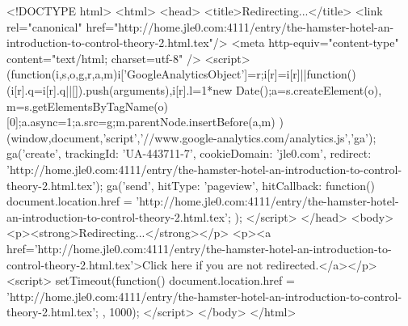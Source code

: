 <!DOCTYPE html>
<html>
<head>
<title>Redirecting...</title>
<link rel="canonical" href="http://home.jle0.com:4111/entry/the-hamster-hotel-an-introduction-to-control-theory-2.html.tex"/>
<meta http-equiv="content-type" content="text/html; charset=utf-8" />
<script>
(function(i,s,o,g,r,a,m){i['GoogleAnalyticsObject']=r;i[r]=i[r]||function(){
(i[r].q=i[r].q||[]).push(arguments)},i[r].l=1*new Date();a=s.createElement(o),
m=s.getElementsByTagName(o)[0];a.async=1;a.src=g;m.parentNode.insertBefore(a,m)
})(window,document,'script','//www.google-analytics.com/analytics.js','ga');
ga('create', { trackingId: 'UA-443711-7', cookieDomain: 'jle0.com', redirect: 'http://home.jle0.com:4111/entry/the-hamster-hotel-an-introduction-to-control-theory-2.html.tex'});
ga('send', { hitType: 'pageview', hitCallback: function() { document.location.href = 'http://home.jle0.com:4111/entry/the-hamster-hotel-an-introduction-to-control-theory-2.html.tex'; } });
</script>
</head>
<body>
  <p><strong>Redirecting...</strong></p>
  <p><a href='http://home.jle0.com:4111/entry/the-hamster-hotel-an-introduction-to-control-theory-2.html.tex'>Click here if you are not redirected.</a></p>
  <script>
    setTimeout(function() { document.location.href = 'http://home.jle0.com:4111/entry/the-hamster-hotel-an-introduction-to-control-theory-2.html.tex'; }, 1000);
  </script>
</body>
</html>
